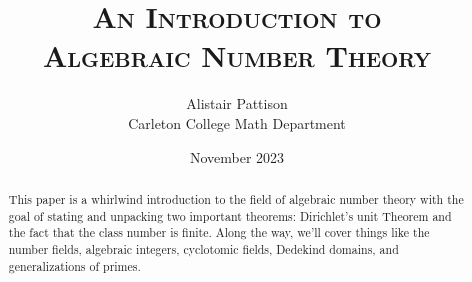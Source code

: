 \documentclass{article}
\title{\scshape {\normalsize An Introduction to} \\ {\scshape Algebraic Number Theory}}
\author{Alistair Pattison \\ {\small Carleton College Math Department}}
\date{November 2023}
\begin{document}
\maketitle

\begin{abstract}
	This paper is a whirlwind introduction to the field of algebraic number	theory with the goal of stating and unpacking two important theorems: Dirichlet's unit Theorem and the fact that the class number is finite. Along the way, we'll cover things like the number fields, algebraic integers, cyclotomic fields, Dedekind domains, and generalizations of primes.
\end{abstract}

\bigskip

\tableofcontents

\pagebreak







\end{document}
